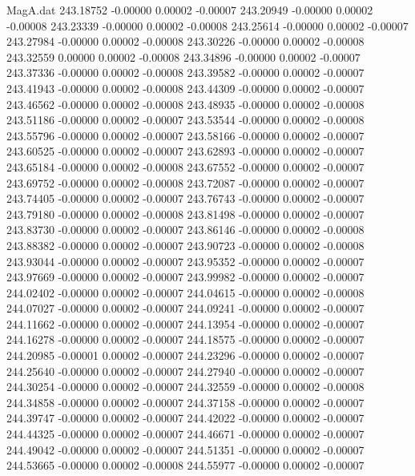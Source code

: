 \begin{filecontents}{MagA.dat}
 243.18752   -0.00000    0.00002   -0.00007
 243.20949   -0.00000    0.00002   -0.00008
 243.23339   -0.00000    0.00002   -0.00008
 243.25614   -0.00000    0.00002   -0.00007
 243.27984   -0.00000    0.00002   -0.00008
 243.30226   -0.00000    0.00002   -0.00008
 243.32559    0.00000    0.00002   -0.00008
 243.34896   -0.00000    0.00002   -0.00007
 243.37336   -0.00000    0.00002   -0.00008
 243.39582   -0.00000    0.00002   -0.00007
 243.41943   -0.00000    0.00002   -0.00008
 243.44309   -0.00000    0.00002   -0.00007
 243.46562   -0.00000    0.00002   -0.00008
 243.48935   -0.00000    0.00002   -0.00008
 243.51186   -0.00000    0.00002   -0.00007
 243.53544   -0.00000    0.00002   -0.00008
 243.55796   -0.00000    0.00002   -0.00007
 243.58166   -0.00000    0.00002   -0.00007
 243.60525   -0.00000    0.00002   -0.00007
 243.62893   -0.00000    0.00002   -0.00007
 243.65184   -0.00000    0.00002   -0.00008
 243.67552   -0.00000    0.00002   -0.00007
 243.69752   -0.00000    0.00002   -0.00008
 243.72087   -0.00000    0.00002   -0.00007
 243.74405   -0.00000    0.00002   -0.00007
 243.76743   -0.00000    0.00002   -0.00007
 243.79180   -0.00000    0.00002   -0.00008
 243.81498   -0.00000    0.00002   -0.00007
 243.83730   -0.00000    0.00002   -0.00007
 243.86146   -0.00000    0.00002   -0.00008
 243.88382   -0.00000    0.00002   -0.00007
 243.90723   -0.00000    0.00002   -0.00008
 243.93044   -0.00000    0.00002   -0.00007
 243.95352   -0.00000    0.00002   -0.00007
 243.97669   -0.00000    0.00002   -0.00007
 243.99982   -0.00000    0.00002   -0.00007
 244.02402   -0.00000    0.00002   -0.00007
 244.04615   -0.00000    0.00002   -0.00008
 244.07027   -0.00000    0.00002   -0.00007
 244.09241   -0.00000    0.00002   -0.00007
 244.11662   -0.00000    0.00002   -0.00007
 244.13954   -0.00000    0.00002   -0.00007
 244.16278   -0.00000    0.00002   -0.00007
 244.18575   -0.00000    0.00002   -0.00007
 244.20985   -0.00001    0.00002   -0.00007
 244.23296   -0.00000    0.00002   -0.00007
 244.25640   -0.00000    0.00002   -0.00007
 244.27940   -0.00000    0.00002   -0.00007
 244.30254   -0.00000    0.00002   -0.00007
 244.32559   -0.00000    0.00002   -0.00008
 244.34858   -0.00000    0.00002   -0.00007
 244.37158   -0.00000    0.00002   -0.00007
 244.39747   -0.00000    0.00002   -0.00007
 244.42022   -0.00000    0.00002   -0.00007
 244.44325   -0.00000    0.00002   -0.00007
 244.46671   -0.00000    0.00002   -0.00007
 244.49042   -0.00000    0.00002   -0.00007
 244.51351   -0.00000    0.00002   -0.00007
 244.53665   -0.00000    0.00002   -0.00008
 244.55977   -0.00000    0.00002   -0.00007

\end{filecontents}
